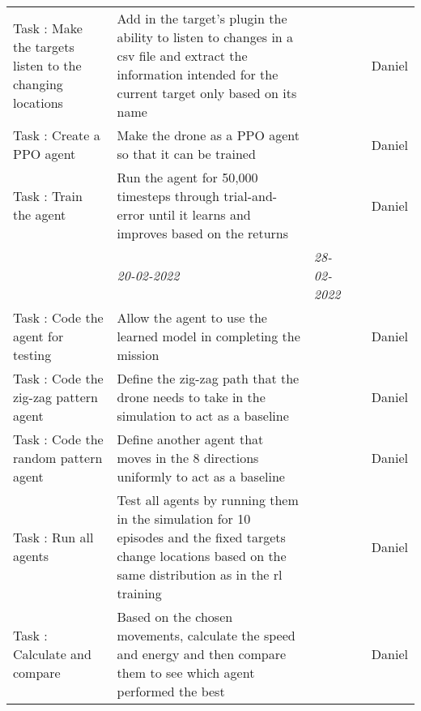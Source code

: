\begin{center}
\begin{small}
\begin{xltabular}{\textwidth}{ p{3cm} p{5cm} X X c }
			Task \thesubcounter: 
			Make the targets listen to the changing locations
			& Add in the target's plugin the ability to listen to
			changes in a csv file and extract the information
			intended for the current target only based on its name
			& & & Daniel \\
			
			Task \thesubcounter: 
			Create a PPO agent
			& Make the \anafi drone as a PPO agent so that it can
			be trained
			& & & Daniel \\
			
			Task \thesubcounter: 
			Train the agent
			& Run the agent for 50,000 timesteps through
			trial-and-error until it learns and improves based on
			the returns
			& & & Daniel \\
			
			\addlinespace
			& \emph{20-02-2022} & \emph{28-02-2022} & 
			\\ \addlinespace
			
			Task \thesubcounter: 
			Code the agent for testing
			& Allow the agent to use the learned model in
			completing the mission 
			& & & Daniel \\
			
			Task \thesubcounter: 
			Code the zig-zag pattern agent
			& Define the zig-zag path that the \anafi drone needs 
			to take in the simulation to act as a baseline
			& & & Daniel \\
			
			Task \thesubcounter: 
			Code the random pattern agent
			& Define another agent that moves in the 8 directions
			uniformly to act as a baseline
			& & & Daniel \\
			
			Task \thesubcounter: 
			Run all agents
			& Test all agents by running them in the simulation
			for 10 episodes and the fixed targets change locations
			based on the same distribution as in the \gls{rl} training
			& & & Daniel \\
			
			Task \thesubcounter: 
			Calculate and compare
			& Based on the chosen movements, calculate the speed
			and energy and then compare them to see which agent
			performed the best 
			& & & Daniel \\
			
			\bottomrule
		\end{xltabular}
	\end{small}
\end{center}


